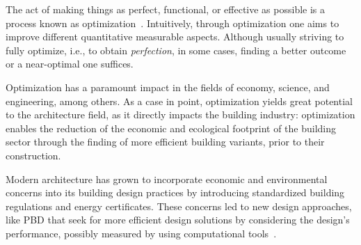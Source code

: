 \cleardoublepage
\label{chap:intro}
	
	The act of making things as perfect, functional, or effective as possible is a process known as optimization~\cite{MerriamWebster2017OptimizationDefinition}. Intuitively, through optimization one aims to improve different quantitative measurable aspects. Although usually striving to fully optimize, i.e., to obtain \textit{perfection}, in some cases, finding a better outcome or a near-optimal one suffices.
	
	Optimization has a paramount impact in the fields of economy, science, and engineering, among others. As a case in point, optimization yields great potential to the architecture field, as it directly impacts the building industry: optimization enables the reduction of the economic and ecological footprint of the building sector through the finding of more efficient building variants, prior to their construction. 
	
	Modern architecture has grown to incorporate economic and environmental concerns into its building design practices by introducing standardized building regulations and energy certificates. These concerns led to new design approaches, like \ac{PBD} that seek for more efficient design solutions by considering the design's performance, possibly measured by using computational tools~\cite{Oxman2006PBD}.
	
